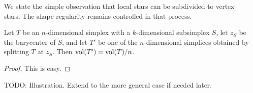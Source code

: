 \documentclass[10pt,a4paper]{article}
\newcommand{\mwl}[1]{{\color{red}#1}}
\begin{document}



We state the simple observation that local stars can be subdivided to vertex stars.
The shape regularity remains controlled in that process. 

\begin{lemma}\label{lemma:stardivision}
    Let $T$ be an $n$-dimensional simplex with a $k$-dimensional subsimplex $S$,
    let $z_S$ be the barycenter of $S$, 
    and let $T'$ be one of the $n$-dimensional simplices obtained by splitting $T$ at $z_{S}$.
    Then $\operatorname{vol}(T') = \operatorname{vol}(T) / n$. 
\end{lemma}
\begin{proof}
    This is easy.
\end{proof}

\mwl{TODO: Illustration. Extend to the more general case if needed later.}
\end{document}
